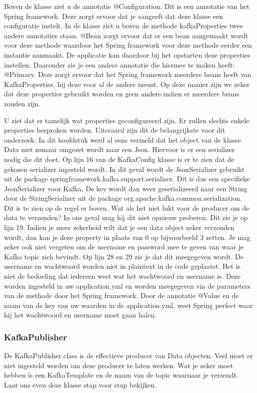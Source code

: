 Boven de klasse ziet u de annotatie @Configuration. Dit is een annotatie van het Spring framework. Deze zorgt ervoor dat je aangeeft dat deze klasse een configuratie instelt. In de klasse ziet u boven de methode kafkaProperties twee andere annotaties staan. @Bean zorgt ervoor dat er een bean aangemaakt wordt voor deze methode waardoor het Spring framework voor deze methode eerder een instantie aanmaakt. De applicatie kan daardoor bij het opstarten deze properties instellen. Daaronder zie je een andere annotatie die hiermee te maken heeft: @Primary. Deze zorgt ervoor dat het Spring framework meerdere beans heeft van KafkaProperties, hij deze voor al de andere neemt. Op deze manier zijn we zeker dat deze properties gebruikt worden en geen andere indien er meerdere beans zouden zijn.

U ziet dat er tamelijk wat properties geconfigureerd zijn. Er zullen slechts enkele properties besproken worden. Uiteraard zijn dit de belangrijkste voor dit onderzoek. In dit hoofdstuk werd al eens vermeld dat het object van de klasse Data niet zomaar omgezet wordt naar een Json. Hiervoor is er een serializer nodig die dit doet. Op lijn 16 van de KafkaConfig klasse is er te zien dat de gekozen serializer ingesteld wordt. In dit geval wordt de JsonSerializer gebruikt uit de package springframework.kafka.support.serializer. Dit is dus een specifieke JsonSerializer voor Kafka. De key wordt dan weer geserializeerd naar een String door de StringSerializer uit de package org.apache.kafka.common.serialization. Dit is te zien op de regel er boven. Wat als het niet lukt voor de producer om de data te verzenden? In ons geval mag hij dit niet opnieuw proberen. Dit zie je op lijn 19. Indien je meer zekerheid wilt dat je een data object zeker verzonden wordt, dan kan je deze property in plaats van 0 op bijvoorbeeld 3 zetten. Je mag zeker ook niet vergeten om de username en password mee te geven van waar je Kafka topic zich bevindt. Op lijn 28 en 29 zie je dat dit meegegeven wordt. De username en wachtwoord worden niet in plaintext in de code geplaatst. Het is niet de bedoeling dat iedereen weet wat het wachtwoord en username is. Deze worden ingesteld in uw application.yml en worden meegegeven via de parameters van de methode door het Spring framework. Door de annotatie @Value en de naam van de key van uw waarden in de application.yml, weet Spring perfect waar hij het wachtwoord en username moet gaan halen.

\subsubsection{KafkaPublisher}
De KafkaPublisher.class is de effectieve producer van Data objecten. Veel moet er niet ingesteld worden om deze producer te laten werken. Wat je zeker moet hebben is een KafkaTemplate en de naam van de topic waarnaar je verzendt. Laat ons even deze klasse stap voor stap bekijken.

